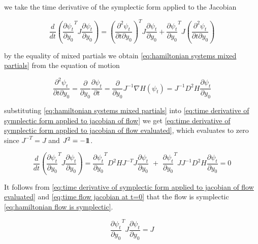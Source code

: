 \documentclass[12pt]{article}
\begin{document}
we take the time derivative of the symplectic form applied to the Jacobian 

\begin{equation}\label{eq:time derivative of symplectic form applied to jacobian of flow}
    \frac{d}{dt}\left( \frac{\partial \psi_t}{\partial y_0}^T J \frac{\partial \psi_t}{\partial y_0} \right)
    =
    \left( \frac{\partial^2 \psi_t}{\partial t \partial y_0} \right)^T J \frac{\partial \psi_t}{\partial y_0} + \frac{\partial \psi_t}{\partial y_0}^T J \left( \frac{\partial^2 \psi_t}{\partial t \partial y_0} \right)
\end{equation}

by the equality of mixed partials we obtain \eqref{eq:hamiltonian systems mixed partials} from the equation of motion

\begin{equation}\label{eq:hamiltonian systems mixed partials}
	\frac{\partial^2 \psi_t}{\partial t\partial y_0} = \frac{\partial }{\partial y_0} \frac{\partial \psi_t}{\partial t} = \frac{\partial}{\partial y_0} J^{-1}\nabla H(\psi_t) = J^{-1} D^2H \frac{\partial \psi_t}{\partial y_0}
\end{equation}

substituting \eqref{eq:hamiltonian systems mixed partials} into \eqref{eq:time derivative of symplectic form applied to jacobian of flow} we get \eqref{eq:time derivative of symplectic form applied to jacobian of flow evaluated}, which evaluates to zero since $J^{-T} = J$ and $J^2 = -1\!\!1$.

\begin{equation}\label{eq:time derivative of symplectic form applied to jacobian of flow evaluated}
    \frac{d}{dt}\left( \frac{\partial \psi_t}{\partial y_0}^T J \frac{\partial \psi_t}{\partial y_0} \right) = 
    \frac{\partial \psi_t}{\partial y_0}^T D^2H J^{-T} J \frac{\partial \psi_t}{\partial y_0} \,\,+\,\, 
    \frac{\partial \psi_t}{\partial y_0}^T J J^{-1} D^2H \frac{\partial \psi_t}{\partial y_0} = 0
\end{equation}

It follows from \eqref{eq:time derivative of symplectic form applied to jacobian of flow evaluated} and \eqref{eq:time flow jacobian at t=0} that the flow is symplectic \eqref{eq:hamiltonian flow is symplectic}.

\begin{equation}\label{eq:hamiltonian flow is symplectic}
    \frac{\partial \psi_t}{\partial y_0}^T J \frac{\partial \psi_t}{\partial y_0} = J
\end{equation}
\end{document}
